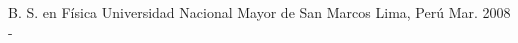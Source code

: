 

\begin{cventries}

  \cventry
    {B. S. en Física} %
    {Universidad Nacional Mayor de San Marcos} %
    {Lima, Perú} %
    {
      Mar. 2008 - \present
    } %
    {
    }
\end{cventries}
